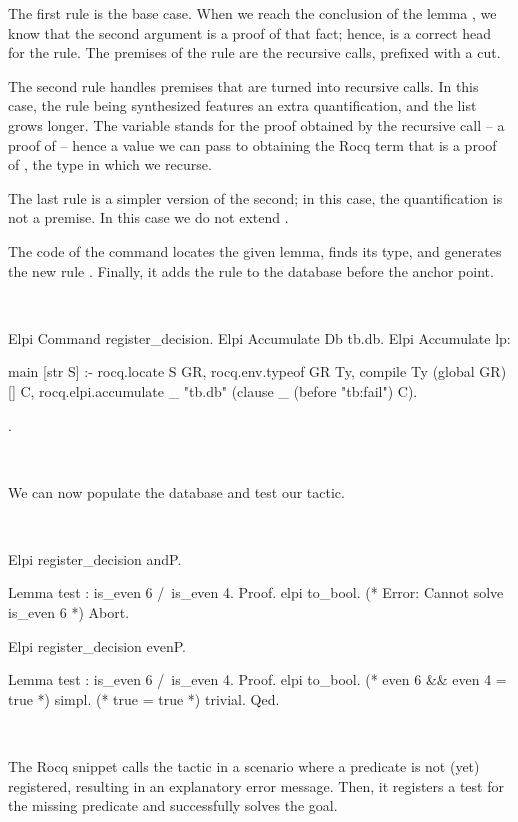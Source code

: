 \documentclass[a4paper, 11pt]{book}
\newenvironment{rocqcode}
  {\VerbatimEnvironment~\\\begin{rocqbox}\begin{xrocqcode}}{\end{xrocqcode}
\end{rocqbox}\\}
\begin{document}
The first rule is the base case. When we reach the conclusion of the lemma
, we know that the second argument  is a proof
of that fact; hence,  is a correct head for the rule. The
premises of the rule are the  recursive calls, prefixed with a cut.


The second rule handles premises that are turned into recursive calls. In this
case, the rule being synthesized features an extra  quantification,
and the  list grows longer.
The  variable stands for the proof
obtained by the recursive call -- a proof of  -- hence
a value we can pass to  obtaining the Rocq term
 that is a proof of , the type in which we
recurse.


The last rule is a simpler version of the second; in this case, the
quantification is not a premise. In this case we do not extend .


The code of the  command locates the given lemma,
finds its type, and generates the new rule . Finally, it adds the rule
to the database before the  anchor point.

\begin{rocqcode}
Elpi Command register_decision.
Elpi Accumulate Db tb.db.
Elpi Accumulate lp:{{
    
main [str S] :-
  rocq.locate S GR,
  rocq.env.typeof GR Ty,
  compile Ty (global GR) [] C,
  rocq.elpi.accumulate _ "tb.db" (clause _ (before "tb:fail") C).

}}.
\end{rocqcode}


We can now populate the database and test our tactic.

\begin{rocqcode}
Elpi register_decision andP.

Lemma test : is_even 6 /\ is_even 4.
Proof.
elpi to_bool. (* Error: Cannot solve is_even 6 *)
Abort.

Elpi register_decision evenP.

Lemma test : is_even 6 /\ is_even 4.
Proof.
elpi to_bool. (* even 6 && even 4 = true *)
simpl.        (* true = true *)
trivial.
Qed.
\end{rocqcode}
  

The Rocq snippet calls the  tactic in a scenario where a
predicate is not (yet) registered, resulting in an explanatory error message.
Then, it registers a test for the missing predicate and successfully solves
the goal.
\end{document}
